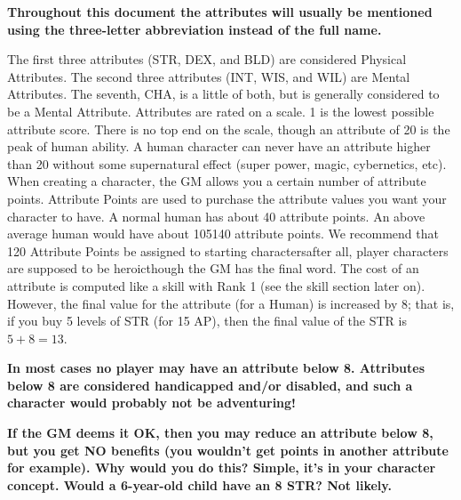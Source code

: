\documentclass[twoside]{book}
\begin{document}
 \textbf{ Throughout this document the attributes will usually
               be mentioned using the three-letter abbreviation instead
               of the full name. }

 The first three attributes (STR, DEX, and BLD) are
               considered Physical Attributes. The second three
               attributes (INT, WIS, and WIL) are Mental Attributes. The
               seventh, CHA, is a little of both, but is generally
               considered to be a Mental Attribute.  Attributes are rated on a scale. 1 is the lowest
               possible attribute score. There is no top end on the
               scale, though an attribute of 20 is the peak of human
               ability. A human character can never have an attribute
               higher than 20 without some supernatural effect (super
               power, magic, cybernetics, etc).  When creating a character, the GM allows you a
               certain number of attribute points. Attribute Points are
               used to purchase the attribute values you want your
               character to have. A normal human has about 40 attribute
               points. An above average human would have about
               105140 attribute points. We recommend that 120
               Attribute Points be assigned to starting
               charactersafter all, player characters are supposed
               to be heroicthough the GM has the final word.
                The cost of an attribute is computed like a skill
              with Rank 1 (see the skill section later on). However, the
              final value for the attribute (for a Human) is increased by
              8; that is, if you buy 5 levels of STR (for 15 AP), then
              the final value of the STR is \begin{math} 5  +
               8  =    13 \end{math}.
            

 \textbf{ In most cases no player may have an attribute below
               8. Attributes below 8 are considered handicapped and/or
               disabled, and such a character would probably not be
               adventuring! }



 \textbf{ If the GM deems it OK, then you may reduce an
               attribute below 8, but you get NO benefits (you
               wouldn't get points in another attribute for
               example). Why would you do this? Simple, it's in
               your character concept. Would a 6-year-old child have an 8
               STR? Not likely. }
\end{document}
